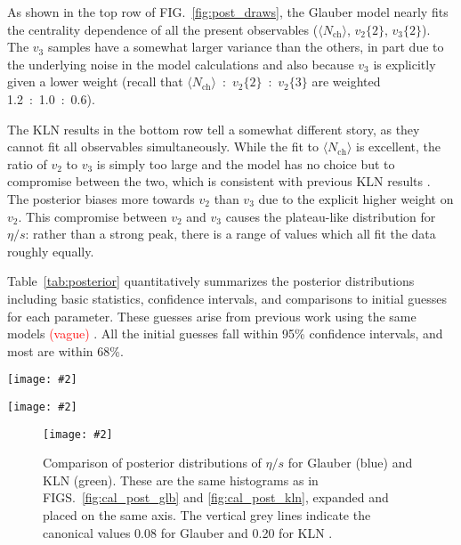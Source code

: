 \documentclass[aps,prc,reprint,superscriptaddress,amsmath]{revtex4-1}
\newcommand{\todo}[1]{\textcolor{red}{#1}}
\newcommand{\colfig}[3][t]{
  \begin{figure}[#1]
    \texttt{[image: \#2]}
    \caption{\label{fig:#2}#3}
  \end{figure}
}
\newcommand{\widefig}[3][t]{
  \begin{figure*}[#1]
    \texttt{[image: \#2]}
    \caption{\label{fig:#2}#3}
  \end{figure*}
}
\newcommand{\avg}[1]{\langle #1 \rangle}
\newcommand{\nch}{N_\text{ch}}
\newcommand{\vnk}[2]{v_#1\{#2\}}
\begin{document}
As shown in the top row of FIG.~\ref{fig:post_draws}, the Glauber model nearly fits the centrality dependence of all the present observables ($\avg\nch$, $\vnk 2 2$, $\vnk 3 2$).
The $v_3$ samples have a somewhat larger variance than the others, in part due to the underlying noise in the model calculations and also because $v_3$ is explicitly given a lower weight (recall that $\avg\nch$~:~$\vnk 2 2$~:~$\vnk 2 3$ are weighted 1.2~:~1.0~:~0.6).

The KLN results in the bottom row tell a somewhat different story, as they cannot fit all observables simultaneously.
While the fit to $\avg\nch$ is excellent, the ratio of $v_2$ to $v_3$ is simply too large and the model has no choice but to compromise between the two, which is consistent with previous KLN results \cite{}.
The posterior biases more towards $v_2$ than $v_3$ due to the explicit higher weight on $v_2$.
This compromise between $v_2$ and $v_3$ causes the plateau-like distribution for $\eta/s$: rather than a strong peak, there is a range of values which all fit the data roughly equally.

Table~\ref{tab:posterior} quantitatively summarizes the posterior distributions including basic statistics, confidence intervals, and comparisons to initial guesses for each parameter.
These guesses arise from previous work using the same models \todo{(vague)} \cite{Shen:2011zc,Heinz:2011kt}.
All the initial guesses fall within 95\% confidence intervals, and most are within 68\%.

\widefig{cal_post_glb}{
  Posterior marginal and joint distributions of the calibration parameters for the Glauber model.
  On the diagonal are histograms of MCMC samples for the respective parameters,
  on the lower triangle are two-dimensional histograms of MCMC samples showing the correlation between pairs of parameters,
  and on the upper triangle are approximate contours for 68\%, 95\%, and 99\% confidence regions along with a dot indicating the median.
}

\widefig{cal_post_kln}{
  Same as FIG.~\ref{fig:cal_post_glb} for the KLN model.
}

\colfig{post_compare}{
  Comparison of posterior distributions of $\eta/s$ for Glauber (blue) and KLN (green).
  These are the same histograms as in FIGS.~\ref{fig:cal_post_glb} and \ref{fig:cal_post_kln}, expanded and placed on the same axis.
  The vertical grey lines indicate the canonical values 0.08 for Glauber and 0.20 for KLN \cite{}.
}

\begin{table*}
  \caption{
    \label{tab:posterior}
    Quantitative summary of posterior distributions.
    For each parameter, the initially guessed value \todo{[cite somehow]}, mean, median, and confidence intervals are given.
  }
  
\end{table*}
\end{document}
